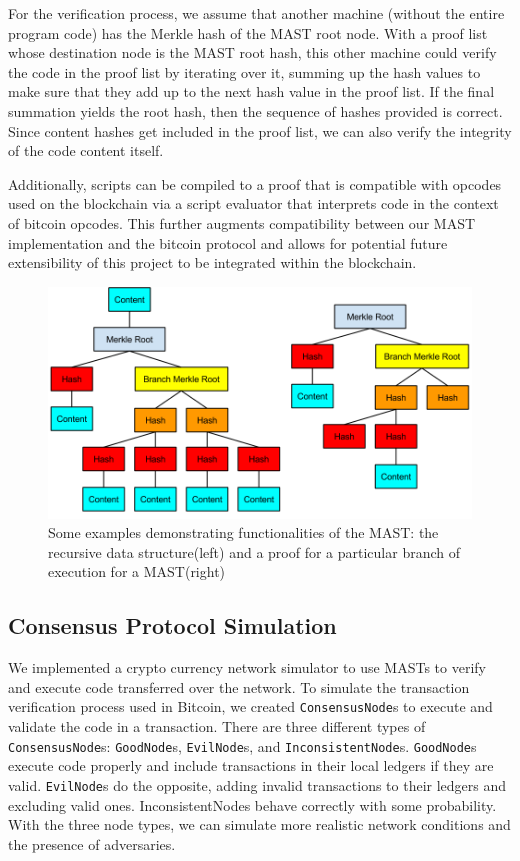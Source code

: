 \documentclass{vldb}
\begin{document}
For the verification process, we assume that another machine (without the entire program code) has the Merkle hash of the MAST root node. With a proof list whose destination node is the MAST root hash, this other machine could verify the code in the proof list by iterating over it, summing up the hash values to make sure that they add up to the next hash value in the proof list. If the final summation yields the root hash, then the sequence of hashes provided is correct. Since content hashes get included in the proof list, we can also verify the integrity of the code content itself.

Additionally, scripts can be compiled to a proof that is compatible with opcodes used on the blockchain via a script evaluator that interprets code in the context of bitcoin opcodes. This further augments compatibility between our MAST implementation and the bitcoin protocol and allows for potential future extensibility of this project to be integrated within the blockchain.

\begin{figure}[h]
	\includegraphics[scale=.35]{mast}
	\caption{Some examples demonstrating functionalities of  the MAST: the recursive data structure(left) and a proof for a particular branch of execution for a MAST(right)}
	\label{mast}
\end{figure}

\subsection{Consensus Protocol Simulation}

We implemented a crypto currency network simulator to use MASTs to verify and execute code transferred over the network. To simulate the transaction verification process used in Bitcoin, we created \texttt{ConsensusNode}s to execute and validate the code in a transaction. There are three different types of \texttt{ConsensusNode}s: \texttt{GoodNode}s, \texttt{EvilNode}s, and \texttt{InconsistentNode}s. \texttt{GoodNode}s execute code properly and include transactions in their local ledgers if they are valid. \texttt{EvilNode}s do the opposite, adding invalid transactions to their ledgers and excluding valid ones. InconsistentNodes behave correctly with some probability. With the three node types, we can simulate more realistic network conditions and the presence of adversaries.
\end{document}
